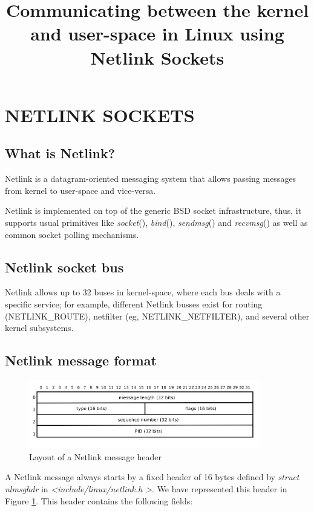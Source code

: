 \documentclass[10pt,onecolumn]{article}
\begin{document}
\title{Communicating between the kernel and user-space in Linux using Netlink Sockets}
\author{}
\date{}
\maketitle

\section{NETLINK SOCKETS}
\subsection{What is Netlink?}
Netlink is a datagram-oriented messaging system that allows passing messages from kernel to user-space and vice-versa.

Netlink is implemented on top of the generic BSD socket infrastructure, thus, it supports usual primitives like \textit{socket}(), \textit{bind}(), \textit{sendmsg}() and \textit{recvmsg}() as well as common socket polling mechanisms.

\subsection{Netlink socket bus}
Netlink allows up to 32 buses in kernel-space, where each bus deals with a specific service; for example, different Netlink busses exist for routing (NETLINK\_ROUTE), netfilter (eg, NETLINK\_NETFILTER), and several other kernel subsystems.

\subsection{Netlink message format}

\begin{figure}[h]
\begin{center}
\includegraphics[height=3cm]{figure/netlink_message_header.png}
\end{center}
\caption{Layout of a Netlink message header}
\label{fig:netlink_message_header}
\end{figure}

A Netlink message always starts by a fixed header of 16 bytes defined by \textit{struct nlmsghdr} in \textit{\textless include/linux/netlink.h \textgreater}. We have represented this header in Figure \ref{fig:netlink_message_header}. This header contains the following fields:
\end{document}

